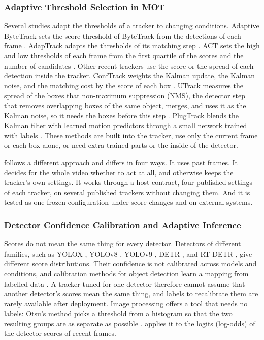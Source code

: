 \subsubsection{Adaptive Threshold Selection in MOT}
Several studies adapt the thresholds of a tracker to changing conditions. Adaptive ByteTrack sets
the score threshold of ByteTrack from the detections of each frame \cite{ma2023adaptivebytetrack}.
AdapTrack adapts the thresholds of its matching step \cite{shim2024adaptrack}. ACT sets the high and
low thresholds of each frame from the first quartile of the scores and the number of candidates
\cite{act2026adaptive}. Other recent trackers use the score or the spread of each detection inside
the tracker. ConfTrack weights the Kalman update, the Kalman noise, and the matching cost by the
score of each box \cite{jung2024conftrack}. UTrack measures the spread of the boxes that
non-maximum suppression (NMS), the detector step that removes overlapping boxes of the same object,
merges, and uses it as the Kalman noise, so it needs the boxes before this step
\cite{solano2025utrack}. PlugTrack blends the Kalman filter with learned motion predictors through a
small network trained with labels \cite{kim2026plugtrack}. These methods are built into the tracker,
use only the current frame or each box alone, or need extra trained parts or the inside of the
detector.

\scl{} follows a different approach and differs in four ways. It uses past frames. It decides for
the whole video whether to act at all, and otherwise keeps the tracker's own settings. It works
through a host contract, four published settings of each tracker, on several published trackers
without changing them. And it is tested as one frozen configuration under score changes and on
external systems.

\subsubsection{Detector Confidence Calibration and Adaptive Inference}

Scores do not mean the same thing for every detector. Detectors of different families, such as
YOLOX \cite{ge2021yolox}, YOLOv8 \cite{jocher2023yolov8}, YOLOv9 \cite{wang2024yolov9}, DETR
\cite{carion2020detr}, and RT-DETR \cite{zhao2024rtdetr}, give different score distributions. Their
confidence is not calibrated across models and conditions, and calibration methods for object
detection learn a mapping from labelled data \cite{kuppers2020detcalib}. A tracker tuned for one
detector therefore cannot assume that another detector's scores mean the same thing, and labels to
recalibrate them are rarely available after deployment. Image processing offers a tool that needs
no labels: Otsu's method picks a threshold from a histogram so that the two resulting groups are as
separate as possible \cite{otsu1979}. \scl{} applies it to the logits (log-odds) of the detector
scores of recent frames.

